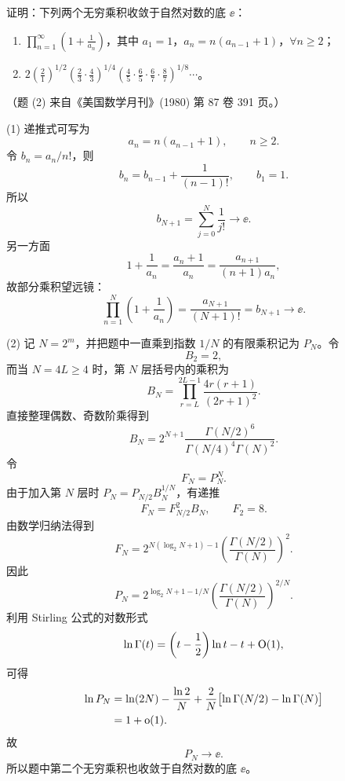 \begin{xreferenceproblem}[8]
证明：下列两个无穷乘积收敛于自然对数的底 $\ee$：
\begin{enumerate}[label=(\arabic*)]
\item $\displaystyle\prod_{n=1}^{\infty}\left(1+\frac1{a_n}\right)$，其中 $a_1=1$，$a_n=n(a_{n-1}+1)$，$\forall n\geq2$；
\item $\displaystyle 2\left(\frac21\right)^{1/2}\left(\frac23\cdot\frac43\right)^{1/4}\left(\frac45\cdot\frac65\cdot\frac67\cdot\frac87\right)^{1/8}\cdots$。
\end{enumerate}
（题 (2) 来自《美国数学月刊》(1980) 第 87 卷 391 页。）
\end{xreferenceproblem}
\begin{xsolution}
(1) 递推式可写为
\[
 a_n=n(a_{n-1}+1),\qquad n\geq2.
\]
令 $b_n=a_n/n!$，则
\[
 b_n=b_{n-1}+\frac1{(n-1)!},
 \qquad b_1=1.
\]
所以
\[
 b_{N+1}=\sum_{j=0}^{N}\frac1{j!}\longrightarrow\ee.
\]
另一方面
\[
 1+\frac1{a_n}=\frac{a_n+1}{a_n}=\frac{a_{n+1}}{(n+1)a_n},
\]
故部分乘积望远镜：
\[
 \prod_{n=1}^{N}\left(1+\frac1{a_n}\right)
 =\frac{a_{N+1}}{(N+1)!}=b_{N+1}\longrightarrow\ee.
\]

(2) 记 $N=2^m$，并把题中一直乘到指数 $1/N$ 的有限乘积记为 $P_N$。令
\[
 B_2=2,
\]
而当 $N=4L\geq4$ 时，第 $N$ 层括号内的乘积为
\[
 B_N=\prod_{r=L}^{2L-1}\frac{4r(r+1)}{(2r+1)^2}.
\]
直接整理偶数、奇数阶乘得到
\[
 B_N
 =2^{N+1}\frac{\Gamma(N/2)^6}{\Gamma(N/4)^4\Gamma(N)^2}.
\]
令
\[
 F_N=P_N^N.
\]
由于加入第 $N$ 层时 $P_N=P_{N/2}B_N^{1/N}$，有递推
\[
 F_N=F_{N/2}^2B_N,
 \qquad F_2=8.
\]
由数学归纳法得到
\[
 F_N
 =2^{N(\log_2N+1)-1}
 \left(\frac{\Gamma(N/2)}{\Gamma(N)}\right)^2.
\]
因此
\[
 P_N
 =2^{\log_2N+1-1/N}
 \left(\frac{\Gamma(N/2)}{\Gamma(N)}\right)^{2/N}.
\]
利用 Stirling 公式的对数形式
\[
 \ln\Gamma(t)=\left(t-\frac12\right)\ln t-t+\mathrm{O}(1),
\]
可得
\[
 \begin{aligned}
 \ln P_N
 &=\ln(2N)-\frac{\ln2}{N}
 +\frac2N\bigl[\ln\Gamma(N/2)-\ln\Gamma(N)\bigr]\\
 &=1+\mathrm{o}(1).
\end{aligned}
\]
故
\[
 \boxed{P_N\longrightarrow\ee}.
\]
所以题中第二个无穷乘积也收敛于自然对数的底 $\ee$。
\end{xsolution}


